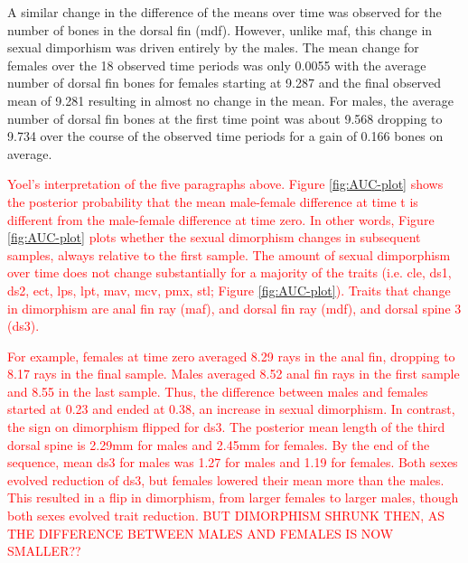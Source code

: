 \documentclass[
  12pt,
]{article}
\begin{document}
A similar change in the difference of the means over time was observed
for the number of bones in the dorsal fin (mdf). However, unlike maf,
this change in sexual dimporhism was driven entirely by the males. The
mean change for females over the 18 observed time periods was only
0.0055 with the average number of dorsal fin bones for females starting
at 9.287 and the final observed mean of 9.281 resulting in almost no
change in the mean. For males, the average number of dorsal fin bones at
the first time point was about 9.568 dropping to 9.734 over the course
of the observed time periods for a gain of 0.166 bones on average.

\textcolor{red} {
Yoel's interpretation of the five paragraphs above. 
Figure \ref{fig:AUC-plot} shows the posterior probability that the mean male-female difference at time t is different from the male-female difference at time zero. In other words, Figure \ref{fig:AUC-plot} plots whether the sexual dimorphism changes in subsequent samples, always relative to the first sample. The amount of sexual dimporphism over time does not change substantially for a majority of the traits (i.e. cle, ds1, ds2, ect, lps, lpt, mav, mcv, pmx, stl; Figure \ref{fig:AUC-plot}). Traits that change in dimorphism are anal fin ray (maf), and dorsal fin ray (mdf), and dorsal spine 3 (ds3).}

\textcolor{red} {
For example, females at time zero averaged 8.29 rays in the anal fin, dropping to 8.17 rays in the final sample. Males averaged 8.52 anal fin rays in the first sample and 8.55 in the last sample. Thus, the difference between males and females started at 0.23 and ended at 0.38, an increase in sexual dimorphism. In contrast, the sign on dimorphism flipped for ds3. The posterior mean length of the third dorsal spine is 2.29mm for males and 2.45mm for females. By the end of the sequence, mean ds3 for males was 1.27 for males and 1.19 for females. Both sexes evolved reduction of ds3, but females lowered their mean more than the males. This resulted in a flip in dimorphism, from larger females to larger males, though both sexes evolved trait reduction. BUT DIMORPHISM SHRUNK THEN, AS THE DIFFERENCE BETWEEN MALES AND FEMALES IS NOW SMALLER??
}
\end{document}
